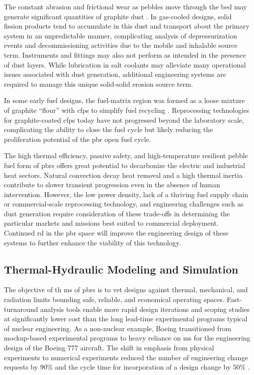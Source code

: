 The constant abrasion and frictional wear as pebbles move through the bed may generate significant quantities of graphite dust \cite{hecker,moormann}. In gas-cooled designs, solid fission products tend to accumulate in this dust and transport about the primary system in an unpredictable manner, complicating analysis of depressurization events and decommissioning activities due to the mobile and inhalable source term. Instruments and fittings may also not perform as intended in the presence of dust layers. While lubrication in salt coolants may alleviate many operational issues associated with dust generation, additional engineering systems are required to manage this unique solid-solid erosion source term.

In some early fuel designs, the fuel-matrix region was formed as a loose mixture of graphite ``flour'' with \glspl{cfp} to simplify fuel recycling \cite{claxton, hecker}. Reprocessing technologies for graphite-coated \glspl{cfp} today have not progressed beyond the laboratory scale, complicating the ability to close the fuel cycle \cite{moses} but likely reducing the proliferation potential of the \gls{pbr} open fuel cycle.

The high thermal efficiency, passive safety, and high-temperature resilient pebble fuel form of \glspl{pbr} offers great potential to decarbonize the electric and industrial heat sectors. Natural convection decay heat removal and a high thermal inertia contribute to slower transient progression even in the absence of human intervention. However, the low power density, lack of a thriving fuel supply chain or commercial-scale reprocessing technology, and engineering challenges such as dust generation require consideration of these trade-offs in determining the particular markets and missions best suited to commercial deployment. Continued \gls{rd} in the \gls{pbr} space will improve the engineering design of these systems to further enhance the viability of this technology.


\subsection{Thermal-Hydraulic Modeling and Simulation}
\label{sec:ph_motivation}

The objective of \gls{th} \gls{ms} of \glspl{pbr} is to vet designs against thermal, mechanical, and radiation limits bounding safe, reliable, and economical operating spaces. Fast-turnaround analysis tools enable more rapid design iterations and scoping studies at significantly lower cost than the long lead-time experimental programs typical of nuclear engineering. As a non-nuclear example, Boeing transitioned from mockup-based experimental programs to heavy reliance on \gls{ms} for the engineering design of the Boeing 777 aircraft. The shift in emphasis from physical experiments to numerical experiments reduced the number of engineering change requests by 90\% and the cycle time for incorporation of a design change by 50\% \cite{boeing}. %

